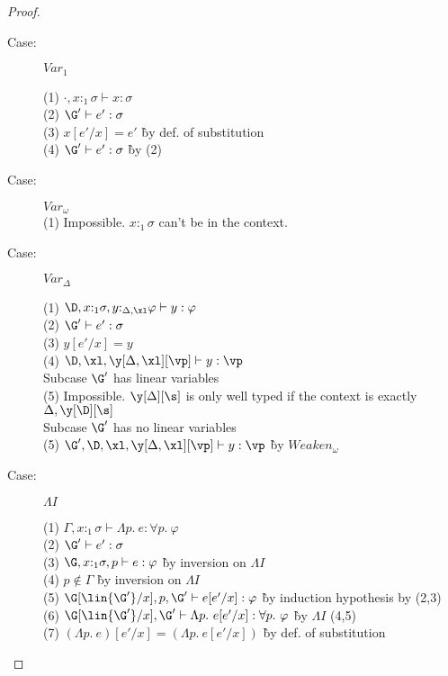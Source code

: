 \begin{proof}
\begin{description}
\item[Case:] $Var_1$
\begin{tabbing}
  (1) $\cdot,x{:}_1\sigma \vdash x : \sigma$\\
  (2) $\G' \vdash e' : \sigma$\\
  (3) $x[e'/x] = e'$ \` by def. of substitution\\
  (4) $\G' \vdash e' : \sigma$ \` by (2)\\
\end{tabbing}

\item[Case:] $Var_\omega$\\
  (1) Impossible. $x{:}_1\sigma$ can't be in the context.\\

\item[Case:] $Var_\Delta$
\begin{tabbing}
  (1) $\D, x{:}_1\sigma, y{:}_{\Delta,\xl}\varphi \vdash y : \varphi$\\
  (2) $\G' \vdash e' : \sigma$\\
  (3) $y[e'/x] = y$\\
  (4) $\D, \xl, \y[\Delta,\xl][\vp] \vdash y : \vp$\\
  Subcase $\G'$ has linear variables\\
  (5) Impossible. $\y[\Delta][\s]$ is only well typed if the context is exactly $\Delta,\y[\D][\s]$\\
  Subcase $\G'$ has no linear variables\\
  (5) $\G', \D, \xl, \y[\Delta,\xl][\vp] \vdash y : \vp$ \` by $Weaken_\omega$\\

\end{tabbing}

\item[Case:] $\Lambda I$
\begin{tabbing}
  (1) $\Gamma, x{:}_1\sigma \vdash \Lambda p.~e : \forall p.~\varphi$\\
  (2) $\G' \vdash e' : \sigma$\\
  (3) $\G, x{:}_1\sigma, p \vdash e : \varphi$ \` by inversion on $\Lambda I$\\
  (4) $p \notin \Gamma$ \` by inversion on $\Lambda I$\\
  (5) $\G[\lin{\G'}/x], p, \G' \vdash e[e'/x] : \varphi$ \` by induction hypothesis by (2,3)\\
  (6) $\G[\lin{\G'}/x], \G' \vdash \Lambda p.~e[e'/x] : \forall p.~\varphi$ \` by $\Lambda I$ (4,5)\\
  (7) $(\Lambda p.~e)[e'/x] = (\Lambda p.~e[e'/x])$ \` by def. of substitution\\
\end{tabbing}


\end{description}
\end{proof}

